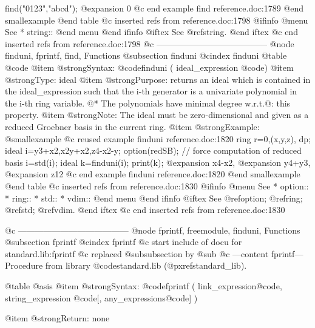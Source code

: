   find("0123","abcd");
@expansion{} 0
@c end example find reference.doc:1789
@end smallexample
@end table
@c inserted refs from reference.doc:1798
@ifinfo
@menu
See
* string::
@end menu
@end ifinfo
@iftex
See
@ref{string}.
@end iftex
@c end inserted refs from reference.doc:1798
@c ---------------------------------------
@node finduni, fprintf, find, Functions
@subsection finduni
@cindex finduni
@table @code
@item @strong{Syntax:}
@code{finduni (} ideal_expression @code{)}
@item @strong{Type:}
ideal
@item @strong{Purpose:}
returns an ideal which is contained in the ideal_expression such that the i-th
generator is a univariate polynomial in the i-th ring variable.
@* The polynomials have minimal degree w.r.t.@: this property.
@item @strong{Note:}
The ideal must be zero-dimensional and given as a reduced Groebner basis in
the current ring.
@item @strong{Example:}
@smallexample
@c reused example finduni reference.doc:1820 
  ring  r=0,(x,y,z), dp;
  ideal i=y3+x2,x2y+x2,z4-x2-y;
  option(redSB);  // force computation of reduced basis
  i=std(i);
  ideal k=finduni(i);
  print(k);
@expansion{} x4-x2,
@expansion{} y4+y3,
@expansion{} z12
@c end example finduni reference.doc:1820
@end smallexample
@end table
@c inserted refs from reference.doc:1830
@ifinfo
@menu
See
* option::
* ring::
* std::
* vdim::
@end menu
@end ifinfo
@iftex
See
@ref{option};
@ref{ring};
@ref{std};
@ref{vdim}.
@end iftex
@c end inserted refs from reference.doc:1830

@c ---------------------------------------
@node fprintf, freemodule, finduni, Functions
@subsection fprintf
@cindex fprintf
@c start include of docu for standard.lib:fprintf
@c replaced @subsubsection by @sub
@c ---content fprintf---
Procedure from library @code{standard.lib} (@pxref{standard_lib}).

@table @asis
@item @strong{Syntax:}
@code{fprintf (} link_expression@code{,} string_expression @code{[,}
any_expressions@code{] )}

@item @strong{Return:}
none

